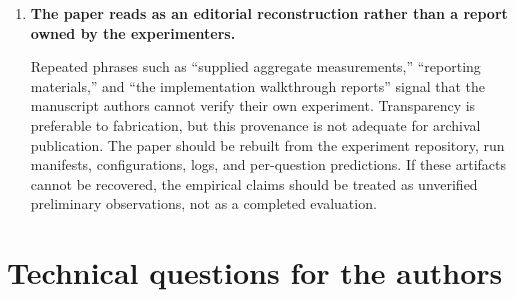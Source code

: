 \documentclass[11pt]{article}
\begin{document}
\begin{enumerate}
  \item \textbf{The paper reads as an editorial reconstruction rather than a report owned by the experimenters.}

  Repeated phrases such as ``supplied aggregate measurements,'' ``reporting materials,'' and ``the implementation walkthrough reports'' signal that the manuscript authors cannot verify their own experiment. Transparency is preferable to fabrication, but this provenance is not adequate for archival publication. The paper should be rebuilt from the experiment repository, run manifests, configurations, logs, and per-question predictions. If these artifacts cannot be recovered, the empirical claims should be treated as unverified preliminary observations, not as a completed evaluation.
\end{enumerate}

\section*{Technical questions for the authors}
\end{document}
